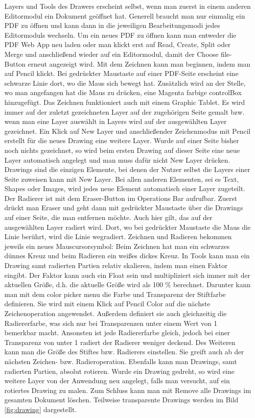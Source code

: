 Layers und Tools des Drawers erscheint selbst, wenn man zuerst in einem anderen Editormodul ein Dokument geöffnet hat. Generell braucht man nur einmalig ein PDF zu öffnen und kann dann in die jeweiligen Bearbeitungsmodi jedes Editormoduls wechseln. Um ein neues PDF zu öffnen kann man entweder die PDF Web App neu laden oder man klickt erst auf Read, Create, Split oder Merge und anschließend wieder auf ein Editormodul, damit der Choose file-Button erneut angezeigt wird. Mit dem Zeichnen kann man beginnen, indem man auf Pencil klickt. Bei gedrückter Maustaste auf einer PDF-Seite erscheint eine schwarze Linie dort, wo die Maus sich bewegt hat. Zusätzlich wird an der Stelle, wo man angefangen hat die Maus zu drücken, eine Magenta farbige controlBox hinzugefügt. Das Zeichnen funktioniert auch mit einem Graphic Tablet. Es wird immer auf der zuletzt gezeichneten Layer auf der zugehörigen Seite gemalt bzw. wenn man eine Layer auswählt in Layers wird auf der ausgewählten Layer gezeichnet. Ein Klick auf New Layer und anschließender Zeichenmodus mit Pencil erstellt für die neues Drawing eine weitere Layer. Wurde auf einer Seite bisher noch nichts gezeichnet, so wird beim ersten Drawing auf dieser Seite eine neue Layer automatisch angelegt und man muss dafür nicht New Layer drücken. Drawings sind die einzigen Elemente, bei denen der Nutzer selbst die Layers einer Seite zuweisen kann mit New Layer. Bei allen anderen Elementen, sei es Text, Shapes oder Images, wird jedes neue Element automatisch einer Layer zugeteilt. Der Radierer ist mit dem Eraser-Button im Operations Bar aufrufbar. Zuerst drückt man Eraser und geht dann mit gedrückter Maustaste über die Drawings auf einer Seite, die man entfernen möchte. Auch hier gilt, das auf der ausgewählten Layer radiert wird. Dort, wo bei gedrückter Maustaste die Maus die Linie berührt, wird die Linie wegradiert. Zeichnen und Radieren bekommen jeweils ein neues Mauscursorsymbol: Beim Zeichnen hat man ein schwarzes dünnes Kreuz und beim Radieren ein weißes dickes Kreuz. In Tools kann man ein Drawing samt radierten Partien relativ skalieren, indem man einen Faktor eingibt. Der Faktor kann auch ein Float sein und multipliziert sich immer mit der aktuellen Größe, d.h. die aktuelle Größe wird als 100 \% berechnet. Darunter kann man mit dem color picker menu die Farbe und Transparenz der Stiftfarbe definieren. Sie wird mit einem Klick auf Pencil Color auf die nächste Zeichenoperation angewendet. Außerdem definiert sie auch gleichzeitig die Radiererfarbe, was sich nur bei Transparenzen unter einem Wert von 1 bemerkbar macht. Ansonsten ist jede Radiererfarbe gleich, jedoch bei einer Transparenz von unter 1 radiert der Radierer weniger deckend. Des Weiteren kann man die Größe des Stiftes bzw. Radierers einstellen. Sie greift auch ab der nächsten Zeichen- bzw. Radieroperation. Ebenfalls kann man Drawings, samt radierten Partien, absolut rotieren. Wurde ein Drawing gedreht, so wird eine weitere Layer von der Anwendung neu angelegt, falls man versucht, auf ein rotiertes Drawing zu malen. Zum Schluss kann man mit Remove alle Drawings im gesamten Dokument löschen. Teilweise transparente Drawings werden im Bild \ref{fig:drawing} dargestellt. 

